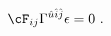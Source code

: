 \begin{equation}
 \cF_{ij} \Gamma^{\hat{u} \hat{i} \hat{j} } \epsilon = 0 ~.
\label{killing2}
\end{equation}

